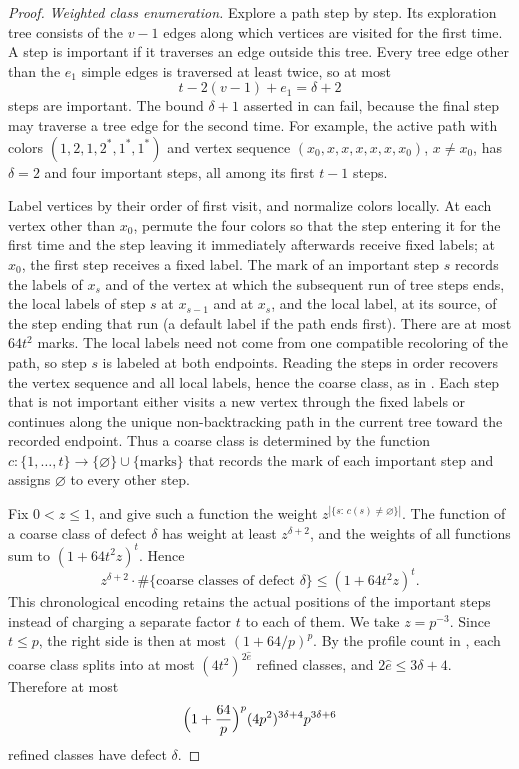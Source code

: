 \documentclass[11pt]{article}
\numberwithin{equation}{section}
\theoremstyle{boldremark}\newtheorem{remark}[theorem]{Remark}
\begin{document}
\begin{proof}
\emph{Weighted class enumeration.}
Explore a path step by step. Its exploration tree consists of the
$v-1$ edges along which vertices are visited for the first time. A
step is important if it traverses an edge outside this tree. Every
tree edge other than the $e_1$ simple edges is traversed at least
twice, so at most
\[
 t-2(v-1)+e_1=\delta+2
\]
steps are important. The bound $\delta+1$ asserted in
\cite[proof of Lemma~5.3, p.~25]{BC} can fail, because the final step
may traverse a tree edge for the second time. For example, the active
path with colors $(1,2,1,2^*,1^*,1^*)$ and vertex sequence
$(x_0,x,x,x,x,x,x_0)$, $x\ne x_0$, has $\delta=2$ and four important
steps, all among its first $t-1$ steps.

Label vertices by their order of first visit, and normalize colors
locally. At each vertex other than $x_0$, permute the four colors so
that the step entering it for the first time and the step leaving it
immediately afterwards receive fixed labels; at $x_0$, the first step
receives a fixed label. The mark of an important step $s$ records the
labels of $x_s$ and of the vertex at which the subsequent run of tree
steps ends, the local labels of step $s$ at $x_{s-1}$ and at $x_s$,
and the local label, at its source, of the step ending that run (a
default label if the path ends first). There are at most $64t^2$ marks. The local labels need not come from
one compatible recoloring of the path, so step $s$ is labeled at both
endpoints. Reading the steps in order recovers the vertex sequence
and all local labels, hence the coarse class, as in
\cite[proof of Lemma~5.3]{BC}. Each step that is not important either
visits a new vertex through the fixed labels or continues along the
unique non-backtracking path in the current tree toward the recorded
endpoint. Thus a coarse class is determined by the function
$c:\{1,\dots,t\}\to\{\varnothing\}\cup\{\text{marks}\}$ that records the mark of each important step and assigns
$\varnothing$ to every other step.

Fix $0<z\le1$, and give such a function the weight
$z^{|\{s:\,c(s)\ne\varnothing\}|}$. The function of a coarse class of
defect $\delta$ has weight at least $z^{\delta+2}$, and the weights of
all functions sum to $(1+64t^2z)^t$. Hence
\[
 z^{\delta+2}\cdot\#\{\text{coarse classes of defect }\delta\}
 \le(1+64t^2z)^t.
\]
This chronological encoding retains the actual positions of the
important steps instead of charging a separate factor $t$ to each of
them. We take $z=p^{-3}$. Since $t\le p$, the right side is then at
most $(1+64/p)^p$. By the profile count in
\cite[proof of Lemma~5.8]{BC}, each coarse class splits into at most
$(4t^2)^{2\hat e}$ refined classes, and $2\hat e\le3\delta+4$.
Therefore at most
\begin{equation}
 \Bigl(1+\frac{64}{p}\Bigr)^p(4p^2)^{3\delta+4}p^{3\delta+6}
 \label{eq:class-count}
\end{equation}
refined classes have defect $\delta$.


\end{proof}
\end{document}
